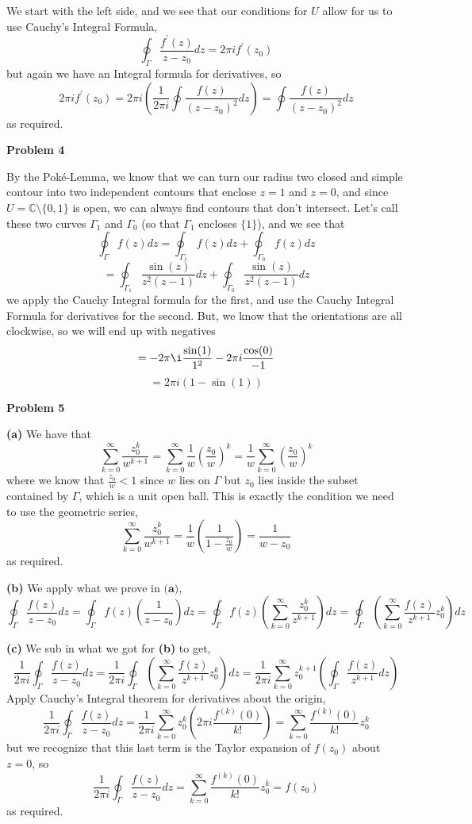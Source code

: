 \documentclass[10pt]{article}
\newcommand{\C}{\mathbb{C}}
\begin{document}
We start with the left side, and we see that our conditions for $U$ allow for us to use Cauchy's Integral Formula,
$$\oint_{\Gamma} \frac{f^{\prime}(z)}{z-z_{0}}dz = 2\pi i f^{\prime}(z_{0})$$
but again we have an Integral formula for derivatives, so
$$2\pi i f^{\prime}(z_{0}) = 2\pi i \left(\frac{1}{2\pi i} \oint \frac{f(z)}{(z-z_{0})^{2}}dz\right) =  \oint \frac{f(z)}{(z-z_{0})^{2}}dz$$
as required.

\textbf{Problem 4}

By the Pok\'e-Lemma, we know that we can turn our radius two closed and simple contour into two independent contours that enclose $z = 1$ and $z = 0$, and since $U = \C \setminus \{0,1\}$ is open, we can always find contours that don't intersect. Let's call these two curves $\Gamma_{1}$ and $\Gamma_{0}$ (so that $\Gamma_{1}$ encloses $\{1\}$), and we see that
$$\oint_{\Gamma}f(z)dz = \oint_{\Gamma_{1}}f(z)dz + \oint_{\Gamma_{0}}f(z)dz$$
$$=\oint_{\Gamma_{1}}\frac{\sin(z)}{z^{2}(z-1)}dz + \oint_{\Gamma_{0}}\frac{\sin(z)}{z^{2}(z-1)}dz$$
we apply the Cauchy Integral formula for the first, and use the Cauchy Integral Formula for derivatives for the second. But, we know that the orientations are all clockwise, so we will end up with negatives
$$=-2\pi \i \frac{\sin(1)}{1^{2}} - 2\pi i \frac{\cos(0)}{-1}$$
$$=2\pi i(1 - \sin(1))$$

\textbf{Problem 5}

\textbf{(a)}
We have that
$$\sum_{k=0}^{\infty}\frac{z_{0}^{k}}{w^{k+1}} = \sum_{k=0}^{\infty}\frac{1}{w}\left(\frac{z_{0}}{w}\right)^{k} = \frac{1}{w} \sum_{k=0}^{\infty}\left(\frac{z_{0}}{w}\right)^{k}$$
where we know that $\frac{z_{0}}{w} < 1$ since $w$ lies on $\Gamma$ but $z_{0}$ lies inside the subset contained by $\Gamma$, which is a unit open ball. This is exactly the condition we need to use the geometric series,
$$\sum_{k=0}^{\infty}\frac{z_{0}^{k}}{w^{k+1}} = \frac{1}{w}\left(\frac{1}{1 - \frac{z_{0}}{w}}\right) = \frac{1}{w - z_{0}}$$
as required.

\textbf{(b)}
We apply what we prove in $\textbf{(a)}$,
$$\oint_{\Gamma}\frac{f(z)}{z-z_{0}}dz = \oint_{\Gamma}f(z)\left(\frac{1}{z-z_{0}}\right)dz = \oint_{\Gamma}f(z)\left(\sum_{k=0}^{\infty}\frac{z_{0}^{k}}{z^{k+1}}\right)dz = \oint_{\Gamma}\left(\sum_{k=0}^{\infty}\frac{f(z)}{z^{k+1}}z_{0}^{k}\right)dz$$

\textbf{(c)}
We sub in what we got for \textbf{(b)} to get,
$$\frac{1}{2\pi i}\oint_{\Gamma}\frac{f(z)}{z - z_{0}}dz = \frac{1}{2\pi i} \oint_{\Gamma}\left(\sum_{k=0}^{\infty}\frac{f(z)}{z^{k+1}}z_{0}^{k}\right)dz = \frac{1}{2\pi i}\sum_{k=0}^{\infty}z_{0}^{k+1}\left(\oint_{\Gamma}\frac{f(z)}{z^{k+1}}dz\right)$$
Apply Cauchy's Integral theorem for derivatives about the origin,
$$\frac{1}{2\pi i}\oint_{\Gamma}\frac{f(z)}{z - z_{0}}dz= \frac{1}{2\pi i}\sum_{k=0}^{\infty}z_{0}^{k}\left(2\pi i\frac{f^{(k)}(0)}{k!}\right) = \sum_{k=0}^{\infty}\frac{f^{(k)}(0)}{k!}z_{0}^{k}$$
but we recognize that this last term is the Taylor expansion of $f(z_{0})$ about $z = 0$, so
$$\frac{1}{2\pi i}\oint_{\Gamma}\frac{f(z)}{z - z_{0}}dz= \sum_{k=0}^{\infty}\frac{f^{(k)}(0)}{k!}z_{0}^{k} = f(z_{0})$$
as required.
\end{document}
